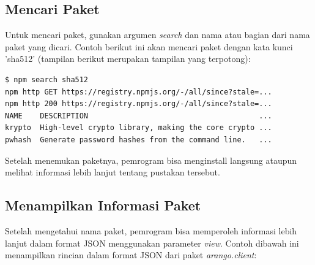 \subsection{Mencari Paket}

Untuk mencari paket, gunakan argumen \textit{search} dan nama atau bagian dari nama paket yang dicari. Contoh berikut ini akan mencari paket dengan kata kunci 'sha512' (tampilan berikut merupakan tampilan yang terpotong):

\lstset{language=bash,caption=Perintah menghapus paket di npm}
\begin{lstlisting}
$ npm search sha512
npm http GET https://registry.npmjs.org/-/all/since?stale=...
npm http 200 https://registry.npmjs.org/-/all/since?stale=...
NAME    DESCRIPTION                                       ...
krypto  High-level crypto library, making the core crypto ...
pwhash  Generate password hashes from the command line.   ...
\end{lstlisting}

Setelah menemukan paketnya, pemrogram bisa menginstall langsung ataupun melihat informasi lebih lanjut tentang pustakan tersebut.

\subsection{Menampilkan Informasi Paket}

Setelah mengetahui nama paket, pemrogram bisa memperoleh informasi lebih lanjut dalam format JSON menggunakan parameter \textit{view}. Contoh dibawah ini menampilkan rincian dalam format JSON dari paket \textit{arango.client}:

